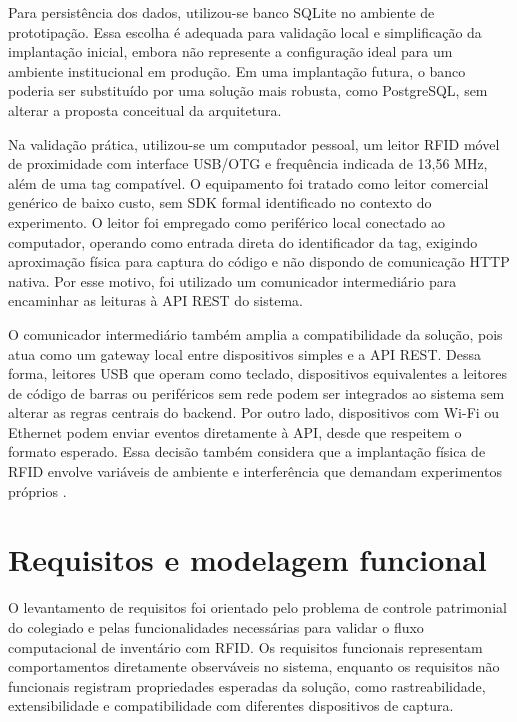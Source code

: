 Para persistência dos dados, utilizou-se banco SQLite no ambiente de prototipação. Essa escolha é adequada para validação local e simplificação da implantação inicial, embora não represente a configuração ideal para um ambiente institucional em produção. Em uma implantação futura, o banco poderia ser substituído por uma solução mais robusta, como PostgreSQL, sem alterar a proposta conceitual da arquitetura.

Na validação prática, utilizou-se um computador pessoal, um leitor RFID móvel de proximidade com interface USB/OTG e frequência indicada de 13,56 MHz, além de uma tag compatível. O equipamento foi tratado como leitor comercial genérico de baixo custo, sem SDK formal identificado no contexto do experimento. O leitor foi empregado como periférico local conectado ao computador, operando como entrada direta do identificador da tag, exigindo aproximação física para captura do código e não dispondo de comunicação HTTP nativa. Por esse motivo, foi utilizado um comunicador intermediário para encaminhar as leituras à API REST do sistema.

O comunicador intermediário também amplia a compatibilidade da solução, pois atua como um gateway local entre dispositivos simples e a API REST. Dessa forma, leitores USB que operam como teclado, dispositivos equivalentes a leitores de código de barras ou periféricos sem rede podem ser integrados ao sistema sem alterar as regras centrais do backend. Por outro lado, dispositivos com Wi-Fi ou Ethernet podem enviar eventos diretamente à API, desde que respeitem o formato esperado. Essa decisão também considera que a implantação física de RFID envolve variáveis de ambiente e interferência que demandam experimentos próprios \cite{knapp2022}.

\section{Requisitos e modelagem funcional}

O levantamento de requisitos foi orientado pelo problema de controle patrimonial do colegiado e pelas funcionalidades necessárias para validar o fluxo computacional de inventário com RFID. Os requisitos funcionais representam comportamentos diretamente observáveis no sistema, enquanto os requisitos não funcionais registram propriedades esperadas da solução, como rastreabilidade, extensibilidade e compatibilidade com diferentes dispositivos de captura.

